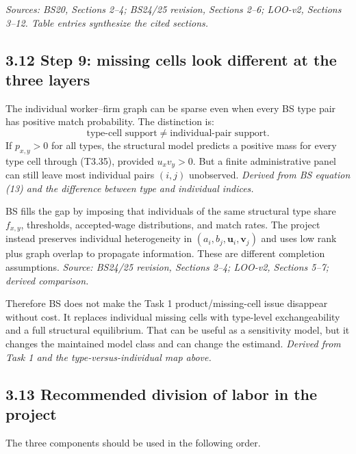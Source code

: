 \documentclass[11pt]{article}
\begin{document}
\textit{Sources: BS20, Sections 2--4; BS24/25 revision, Sections 2--6;
LOO-v2, Sections 3--12.  Table entries synthesize the cited sections.}

\subsection{3.12 Step 9: missing cells look different at the three layers}

The individual worker--firm graph can be sparse even when every BS type pair
has positive match probability.  The distinction is:
\[
\text{type-cell support}
\neq
\text{individual-pair support}.
\tag{T3.78}
\]
If \(p_{x,y}>0\) for all types, the structural model predicts a positive mass
for every type cell through (T3.35), provided \(u_xv_y>0\).  But a finite
administrative panel can still leave most individual pairs \((i,j)\)
unobserved.
\textit{Derived from BS equation (13) and the difference between type and
individual indices.}

BS fills the gap by imposing that individuals of the same structural type
share \(f_{x,y}\), thresholds, accepted-wage distributions, and match rates.
The project instead preserves individual heterogeneity in
\((a_i,b_j,\mathbf u_i,\mathbf v_j)\) and uses low rank plus graph overlap to
propagate information.  These are different completion assumptions.
\textit{Source: BS24/25 revision, Sections 2--4; LOO-v2, Sections 5--7;
derived comparison.}

Therefore BS does not make the Task 1 product/missing-cell issue disappear
without cost.  It replaces individual missing cells with type-level
exchangeability and a full structural equilibrium.  That can be useful as a
sensitivity model, but it changes the maintained model class and can change
the estimand.
\textit{Derived from Task 1 and the type-versus-individual map above.}

\subsection{3.13 Recommended division of labor in the project}

The three components should be used in the following order.
\end{document}
